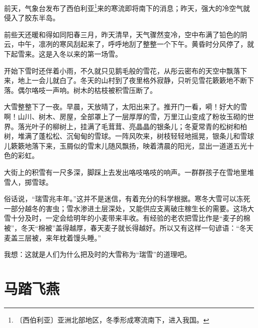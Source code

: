 \documentclass[12pt,UTF-8,openany]{ctexbook}
\begin{document}
\begin{large}
    
    前天，气象台发布了西伯利亚\footnote{〔西伯利亚〕亚洲北部地区，冬季形成寒流南下，进入我国。}来的寒流即将南下的消息；昨天，强大的冷空气就侵入了胶东半岛。
    
    前些天还暖和得如同阳春三月，昨天清早，天气骤然变冷，空中布满了铅色的阴云，中午，凛冽的寒风刮起来了，呼呼地刮了整整一个下午。黄昏时分风停了，就下起雪来。这是入冬以来的第一场雪。
    
    开始下雪时还伴着小雨，不久就只见鹅毛般的雪花，从彤云密布的天空中飘落下来，地上一会儿就白了。冬天的山村到了夜里格外寂静，只听见雪花簌簌地不断下落。偶尔咯吱一声响。树木的枯枝被积雪压断了。
    
    大雪整整下了一夜。早晨，天放晴了，太阳出来了。推开门一看，嗬！好大的雪啊！山川、树木、房屋，全部罩上了一层厚厚的雪，万里江山变成了粉妆玉砌的世界。落光叶子的柳树上，挂满了毛茸茸、亮晶晶的银条儿；冬夏常青的松树和柏树，堆满了蓬松松、沉甸甸的雪球。一阵风吹来，树枝轻轻地摇晃，银条儿和雪球儿簌簌地落下来，玉屑似的雪末儿随风飘扬，映着清晨的阳光，显出一道道五光十色的彩虹。
    
    大街上的积雪有一尺多深，脚踩上去发出咯吱咯吱的响声。一群群孩子在雪地里堆雪人，掷雪球。
    
    俗话说，“瑞雪兆丰年。”这并不是迷信，有着充分的科学根据。寒冬大雪可以冻死一部分越冬的害虫；雪水渗进土层深处，又能供应支离破庄稼生长的需要。这场大雪十分及时，一定会给明年的小麦带来丰收。有经验的老农把雪比作是“麦子的棉被”，冬天“棉被”盖得越厚，春天麦子就长得越好。所以又有这样一句谚语：“冬天麦盖三层被，来年枕着馒头睡。”
    
    我想：这就是人们为什么把及时的大雪称为“瑞雪”的道理吧。
    
\end{large}



\chapter{马踏飞燕}
\end{document}

